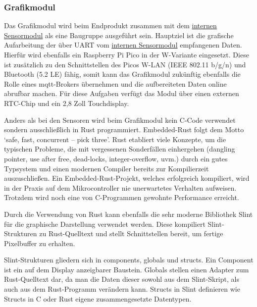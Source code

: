 \documentclass[a4paper,11pt]{article}
\begin{document}
\subsubsection{Grafikmodul}
\label{subsubsub:grafikmodulInt}

Das Grafikmodul wird beim Endprodukt zusammen mit dem \hyperref[subsubsub:sensormodulInt]{internen Sensormodul} als eine Baugruppe ausgeführt sein.
Hauptziel ist die grafische Aufarbeitung der über UART vom \hyperref[subsubsub:sensormodulInt]{internen Sensormodul} empfangenen Daten.
Hierfür wird ebenfalls ein Raspberry Pi Pico in der W-Variante eingesetzt.
Diese ist zusätzlich zu den Schnittstellen des Picos W-LAN (IEEE 802.11 b/g/n) und Bluetooth (5.2 LE) fähig, somit kann das Grafikmodul zukünftig ebenfalls die Rolle eines mqtt-Brokers übernehmen und die aufbereiteten Daten online abrufbar machen.
Für diese Aufgaben verfügt das Modul über einen externen RTC-Chip und ein 2,8 Zoll Touchdisplay.

\vspace{0.3cm}
\noindent
Anders als bei den Sensoren wird beim Grafikmodul kein C-Code verwendet sondern ausschließlich in Rust programmiert.
Embedded-Rust folgt dem Motto \textquoteleft safe, fast, concurrent – pick three\textquoteright.
Rust etabliert viele Konzepte, um die typischen Probleme, die mit vergessenen Sonderfällen einhergehen (dangling pointer, use after free, dead-locks, integer-overflow, uvm.) durch ein gutes Typsystem und einen modernen Compiler bereits zur Kompilierzeit auszuschließen.
Ein Embedded-Rust-Projekt, welches erfolgreich kompiliert, wird in der Praxis auf dem Mikrocontroller nie unerwartetes Verhalten aufweisen.
Trotzdem wird noch eine von C-Programmen gewohnte Performance erreicht.

\vspace{0.3cm}
\noindent
Durch die Verwendung von Rust kann ebenfalls die sehr moderne Bibliothek Slint für die graphische Darstellung verwendet werden. Diese kompiliert Slint-Strukturen zu Rust-Quelltext und stellt Schnittstellen bereit, um fertige Pixelbuffer zu erhalten.

\vspace{0.3cm}
\noindent
Slint-Strukturen gliedern sich in components, globals und structs.
Ein Component ist ein auf dem Display anzeigbarer Baustein.
Globals stellen einen Adapter zum Rust-Quelltext dar, da man die Daten dieser sowohl aus dem Slint-Skript, als auch aus dem Rust-Programm verändern kann.
Structs in Slint definieren wie Structs in C oder Rust eigene zusammengesetzte Datentypen.
\end{document}
